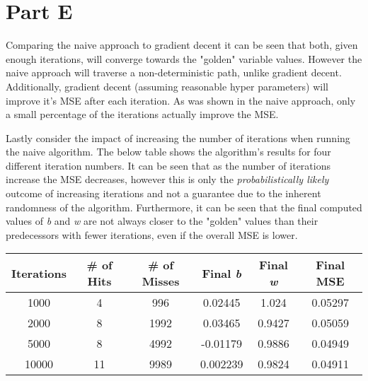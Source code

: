 \newpage
\section{Part E}
\label{sec:sec_e}

Comparing the naive approach to gradient decent it can be seen that both, given enough iterations, will converge towards the "golden" variable values. However the naive approach will traverse a non-deterministic path, unlike gradient decent. Additionally, gradient decent (assuming reasonable hyper parameters) will improve it's MSE after each iteration. As was shown in the naive approach, only a small percentage of the iterations actually improve the MSE.

Lastly consider the impact of increasing the number of iterations when running the naive algorithm. The below table shows the algorithm's results for four different iteration numbers. It can be seen that as the number of iterations increase the MSE decreases, however this is only the \textit{probabilistically likely} outcome of increasing iterations and not a guarantee due to the inherent randomness of the algorithm. Furthermore, it can be seen that the final computed values of \textit{b} and \textit{w} are not always closer to the "golden" values than their predecessors with fewer iterations, even if the overall MSE is lower.   

\begin{center}
\begin{tabular}{||c|c|c|c|c|c||}
	\hline
	Iterations & \# of Hits & \# of Misses & Final \textit{b} & Final \textit{w} & Final MSE \\
	\hline
	1000 & 4 & 996 & 0.02445 & 1.024 & 0.05297 \\
	2000 & 8 & 1992 & 0.03465 & 0.9427 & 0.05059 \\
	5000 & 8 & 4992 & -0.01179 & 0.9886 & 0.04949 \\
	10000 & 11 & 9989 & 0.002239 & 0.9824 & 0.04911 \\
	\hline
\end{tabular}
\end{center}

